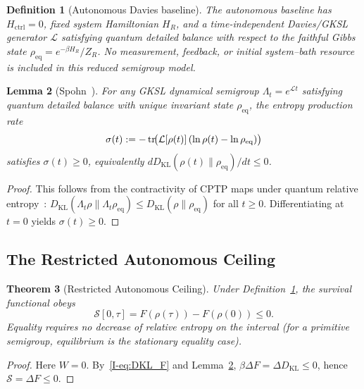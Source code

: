 \documentclass[12pt,a4paper,openany]{book}
\newtheorem{theorem}{Theorem}[chapter]
\newtheorem{lemma}[theorem]{Lemma}
\newtheorem{definition}[theorem]{Definition}
\begin{document}
\begin{definition}[Autonomous Davies baseline]
\label{I-def:autonomous_davies}
The autonomous baseline has $H_{\mathrm{ctrl}}=0$, fixed system
Hamiltonian $H_R$, and a time-independent Davies/GKSL generator
$\mathcal L$ satisfying quantum detailed balance with respect to the
faithful Gibbs state $\rho_{\mathrm{eq}}=e^{-\beta H_R}/Z_R$.
No measurement, feedback, or initial system--bath resource is included
in this reduced semigroup model.
\end{definition}

\begin{lemma}[Spohn~\cite{Spohn1978}]
\label{I-lem:spohn}
For any GKSL dynamical semigroup $\Lambda_t = e^{\mathcal{L}t}$
satisfying quantum detailed balance with unique invariant state
$\rho_{\mathrm{eq}}$, the entropy production
rate
\begin{equation}
\label{I-eq:spohn_sigma}
\sigma(t) := -\tr\!\bigl(\mathcal{L}[\rho(t)]\,
(\ln\rho(t) - \ln\rho_{\mathrm{eq}})\bigr)
\end{equation}
satisfies $\sigma(t) \geq 0$, equivalently
$dD_{\mathrm{KL}}(\rho(t)\|\rho_{\mathrm{eq}})/dt\leq0$.
\end{lemma}

\begin{proof}
This follows from the contractivity of CPTP maps under quantum
relative entropy~\cite{Spohn1978,BreuerPetruccione2002}:
$D_{\mathrm{KL}}(\Lambda_t\rho \| \Lambda_t\rho_{\mathrm{eq}})
\leq D_{\mathrm{KL}}(\rho \| \rho_{\mathrm{eq}})$
for all $t \geq 0$.
Differentiating at $t = 0$ yields $\sigma(t) \geq 0$.
\end{proof}

\subsection{The Restricted Autonomous Ceiling}

\begin{theorem}[Restricted Autonomous Ceiling]
\label{I-thm:autonomous_ceiling}
Under Definition~\ref{I-def:autonomous_davies}, the survival functional
obeys
\begin{equation}
\label{I-eq:ceiling}
\mathcal S[0,\tau]=F(\rho(\tau))-F(\rho(0))\leq0.
\end{equation}
Equality requires no decrease of relative entropy on the interval
(for a primitive semigroup, equilibrium is the stationary equality case).
\end{theorem}

\begin{proof}
Here $W=0$.  By~\eqref{I-eq:DKL_F} and Lemma~\ref{I-lem:spohn},
$\beta\Delta F=\Delta D_{\mathrm{KL}}\leq0$, hence
$\mathcal S=\Delta F\leq0$.
\end{proof}
\end{document}
